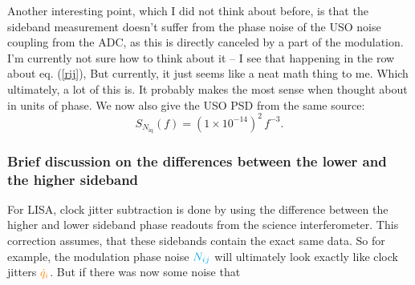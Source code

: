\documentclass[11pt]{article}
\begin{document}
Another interesting point, which I did not think about before, is that the sideband measurement doesn't suffer from the phase noise of the USO noise coupling from the ADC, as this is directly canceled by a part of the modulation. I'm currently not sure how to think about it -- I see that happening in the row about eq. (\ref{rij}), But currently, it just seems like a neat math thing to me. Which ultimately, a lot of this is. It probably makes the most sense when thought about in units of phase.
We now also give the USO PSD from the same source:
\begin{equation*}
    S_{N_{\mathrm{iq}}}(f) = (1 \times 10^{-14})^2 \, f^{-3}.
\end{equation*}

\subsubsection{Brief discussion on the differences between the lower and the higher sideband}
For LISA, clock jitter subtraction is done by using the difference between the higher and lower sideband phase readouts from the science interferometer. This correction assumes, that these sidebands contain the exact same data. So for example, the modulation phase noise $\color{cyan}N_{ij}$ will ultimately look exactly like clock jitters $\color{orange}\dot{q}_i$. But if there was now some noise that 
\end{document}
